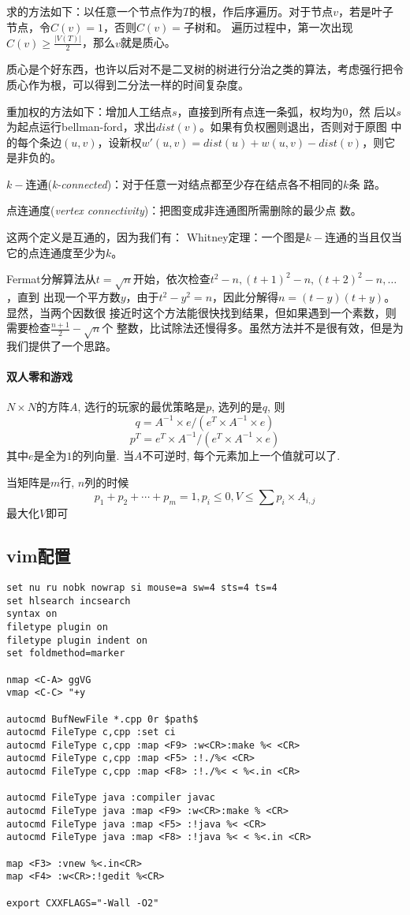 \documentclass{article}
\begin{document}
求的方法如下：以任意一个节点作为$T$的根，作后序遍历。对于节点$v$，若是叶子节点，令$C(v)=1$，否则$C(v)=$子树和。
遍历过程中，第一次出现$C(v)\ge\frac{|V(T)|}{2}$，那么$v$就是质心。

质心是个好东西，也许以后对不是二叉树的树进行分治之类的算法，考虑强行把令质心作为根，可以得到二分法一样的时间复杂度。

重加权的方法如下：增加人工结点$s$，直接到所有点连一条弧，权均为0，然
后以$s$为起点运行bellman-ford，求出$dist(v)$。如果有负权圈则退出，否则对于原图
中的每个条边$(u,v)$，设新权$w'(u,v)=dist(u)+w(u,v)-dist(v)$，则它是非负的。

$k-$连通(\emph{k-connected})：对于任意一对结点都至少存在结点各不相同的$k$条
路。

点连通度(\emph{vertex connectivity})：把图变成非连通图所需删除的最少点
数。

这两个定义是互通的，因为我们有：
Whitney定理：一个图是$k-$连通的当且仅当它的点连通度至少为$k$。

Fermat分解算法从$t=\sqrt{n}$开始，依次检查$t^2-n,(t+1)^2-n,(t+2)^2-n,\ldots$，直到
出现一个平方数$y$，由于$t^2-y^2=n$，因此分解得$n=(t-y)(t+y)$。显然，当两个因数很
接近时这个方法能很快找到结果，但如果遇到一个素数，则需要检查$\frac{n+ 1}{2}-\sqrt{n}$个
整数，比试除法还慢得多。虽然方法并不是很有效，但是为我们提供了一个思路。

\paragraph{双人零和游戏}

$N \times N$的方阵$A$, 选行的玩家的最优策略是$p$, 选列的是$q$, 则 \[q = A^{-1} \times e / (e^T \times A^{-1} \times e)\] \[p^T = e^T
\times A^{-1} / (e^T \times A^{-1} \times e)\]
其中$e$是全为$1$的列向量. 当$A$不可逆时, 每个元素加上一个值就可以了.

当矩阵是$m$行, $n$列的时候 \[p_1 + p_2 + \cdots + p_m = 1, p_i
\le 0, V \le \sum p_i \times A_{i, j}\] 最大化$V$即可

\subsection{vim配置}

\begin{lstlisting}
set nu ru nobk nowrap si mouse=a sw=4 sts=4 ts=4
set hlsearch incsearch
syntax on
filetype plugin on
filetype plugin indent on
set foldmethod=marker

nmap <C-A> ggVG
vmap <C-C> "+y

autocmd BufNewFile *.cpp 0r $path$
autocmd FileType c,cpp :set ci
autocmd FileType c,cpp :map <F9> :w<CR>:make %< <CR>
autocmd FileType c,cpp :map <F5> :!./%< <CR>
autocmd FileType c,cpp :map <F8> :!./%< < %<.in <CR>

autocmd FileType java :compiler javac
autocmd FileType java :map <F9> :w<CR>:make % <CR>
autocmd FileType java :map <F5> :!java %< <CR>
autocmd FileType java :map <F8> :!java %< < %<.in <CR>

map <F3> :vnew %<.in<CR>
map <F4> :w<CR>:!gedit %<CR>

export CXXFLAGS="-Wall -O2"
\end{lstlisting}
\end{document}
